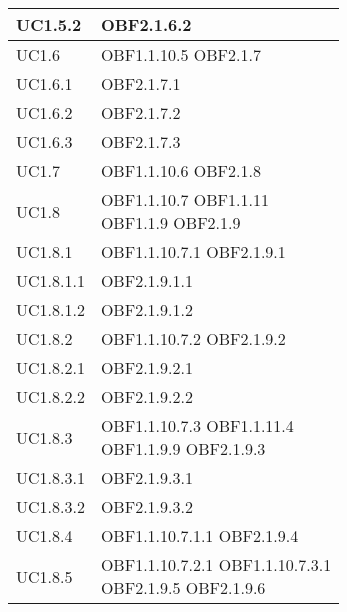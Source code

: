 \documentclass{scalatekids-article}
\begin{document}
\begin{longtable}[H]{|p{5.5cm}|p{5.5cm}|}
  \hline
  UC1.5.2 & \multiLineCell[t]{OBF2.1.6.2\\}\\
  \hline
  UC1.6 & \multiLineCell[t]{OBF1.1.10.5 OBF2.1.7\\}\\
  \hline
  UC1.6.1 & \multiLineCell[t]{OBF2.1.7.1\\}\\
  \hline
  UC1.6.2 & \multiLineCell[t]{OBF2.1.7.2\\}\\
  \hline
  UC1.6.3 & \multiLineCell[t]{OBF2.1.7.3\\}\\
  \hline
  UC1.7 & \multiLineCell[t]{OBF1.1.10.6 OBF2.1.8\\}\\
  \hline
  UC1.8 & \multiLineCell[t]{OBF1.1.10.7 OBF1.1.11\\OBF1.1.9 OBF2.1.9\\}\\
  \hline
  UC1.8.1 & \multiLineCell[t]{OBF1.1.10.7.1 OBF2.1.9.1\\}\\
  \hline
  UC1.8.1.1 & \multiLineCell[t]{OBF2.1.9.1.1\\}\\
  \hline
  UC1.8.1.2 & \multiLineCell[t]{OBF2.1.9.1.2\\}\\
  \hline
  UC1.8.2 & \multiLineCell[t]{OBF1.1.10.7.2 OBF2.1.9.2\\}\\
  \hline
  UC1.8.2.1 & \multiLineCell[t]{OBF2.1.9.2.1\\}\\
  \hline
  UC1.8.2.2 & \multiLineCell[t]{OBF2.1.9.2.2\\}\\
  \hline
  UC1.8.3 & \multiLineCell[t]{OBF1.1.10.7.3 OBF1.1.11.4\\OBF1.1.9.9 OBF2.1.9.3\\}\\
  \hline
  UC1.8.3.1 & \multiLineCell[t]{OBF2.1.9.3.1\\}\\
  \hline
  UC1.8.3.2 & \multiLineCell[t]{OBF2.1.9.3.2\\}\\
  \hline
  UC1.8.4 & \multiLineCell[t]{OBF1.1.10.7.1.1 OBF2.1.9.4\\}\\
  \hline
  UC1.8.5 & \multiLineCell[t]{OBF1.1.10.7.2.1 OBF1.1.10.7.3.1\\OBF2.1.9.5 OBF2.1.9.6\\}\\

\end{longtable}
\end{document}
